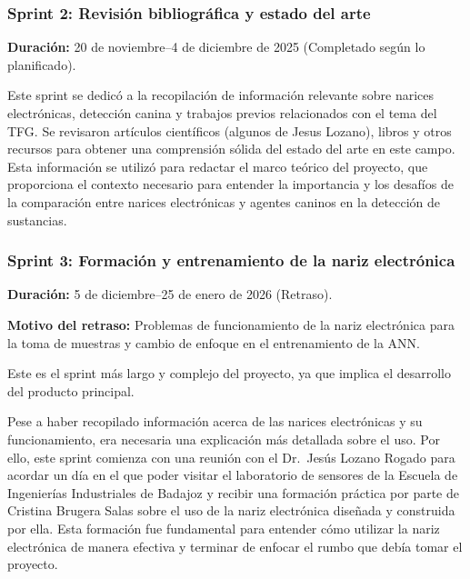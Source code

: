 \subsubsection{Sprint 2: Revisión bibliográfica y estado del arte}
\textbf{Duración:} 20 de noviembre--4 de diciembre de 2025 (Completado según lo planificado).
\par

Este sprint se dedicó a la recopilación de información relevante sobre narices electrónicas, detección canina y trabajos previos relacionados con el tema del TFG\@. Se revisaron artículos científicos (algunos de Jesus Lozano), libros y otros recursos para obtener una comprensión sólida del estado del arte en este campo. Esta información se utilizó para redactar el marco teórico del proyecto, que proporciona el contexto necesario para entender la importancia y los desafíos de la comparación entre narices electrónicas y agentes caninos en la detección de sustancias.
\par

\subsubsection{Sprint 3: Formación y entrenamiento de la nariz electrónica}
\textbf{Duración:} 5 de diciembre--25 de enero de 2026 (Retraso).

\textbf{Motivo del retraso:} Problemas de funcionamiento de la nariz electrónica para la toma de muestras y cambio de enfoque en el entrenamiento de la ANN\@.
\par

Este es el sprint más largo y complejo del proyecto, ya que implica el desarrollo del producto principal.
\par

Pese a haber recopilado información acerca de las narices electrónicas y su funcionamiento, era necesaria una explicación más detallada sobre el uso. Por ello, este sprint comienza con una reunión con el Dr.\ Jesús Lozano Rogado para acordar un día en el que poder visitar el laboratorio de sensores de la Escuela de Ingenierías Industriales de Badajoz y recibir una formación práctica por parte de Cristina Brugera Salas sobre el uso de la nariz electrónica diseñada y construida por ella. Esta formación fue fundamental para entender cómo utilizar la nariz electrónica de manera efectiva y terminar de enfocar el rumbo que debía tomar el proyecto.
\par

